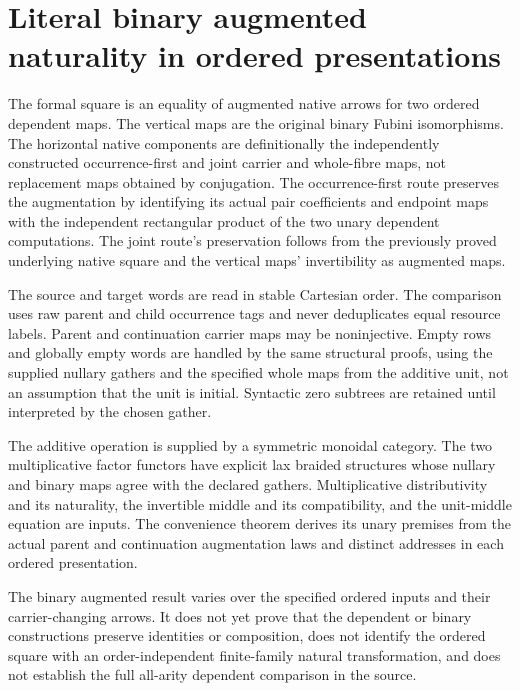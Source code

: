 \documentclass{article}
\begin{document}
\section*{Literal binary augmented naturality in ordered presentations}
The formal square is an equality of augmented native arrows for two
ordered dependent maps. The vertical maps are the original binary
Fubini isomorphisms. The horizontal native components are definitionally
the independently constructed occurrence-first and joint carrier
and whole-fibre maps, not replacement maps obtained by conjugation.
The occurrence-first route preserves the augmentation by identifying
its actual pair coefficients and endpoint maps with the independent
rectangular product of the two unary dependent computations. The
joint route's preservation follows from the previously proved
underlying native square and the vertical maps' invertibility as
augmented maps.

The source and target words are read in stable Cartesian order.
The comparison uses raw parent and child occurrence tags and never
deduplicates equal resource labels. Parent and continuation carrier
maps may be noninjective. Empty rows and globally empty words are
handled by the same structural proofs, using the supplied nullary
gathers and the specified whole maps from the additive unit, not
an assumption that the unit is initial. Syntactic zero subtrees
are retained until interpreted by the chosen gather.

The additive operation is supplied by a symmetric monoidal category.
The two multiplicative factor functors have explicit lax braided
structures whose nullary and binary maps agree with the declared
gathers. Multiplicative distributivity and its naturality,
the invertible middle and its compatibility, and the unit-middle
equation are inputs. The convenience theorem derives its unary
premises from the actual parent and continuation augmentation
laws and distinct addresses in each ordered presentation.

The binary augmented result varies over the specified ordered
inputs and their carrier-changing arrows. It does not yet prove
that the dependent or binary constructions preserve identities
or composition, does not identify the ordered square with an
order-independent finite-family natural transformation, and does
not establish the full all-arity dependent comparison in the source.
\end{document}
